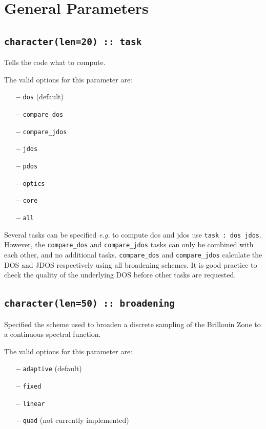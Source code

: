\documentclass[a4paper,11pt,twoside]{book}
\begin{document}
\clearpage


\section{General Parameters}
\subsection[task]{\tt character(len=20) :: task}

Tells the code what to compute. 

The valid options for this parameter are:
\begin{itemize}
\item[{\bf --}]  \verb#dos# (default)
\item[{\bf --}]  \verb#compare_dos#
\item[{\bf --}]  \verb#compare_jdos#
\item[{\bf --}]  \verb#jdos#
\item[{\bf --}]  \verb#pdos#
\item[{\bf --}]  \verb#optics#
\item[{\bf --}]  \verb#core#
\item[{\bf --}]  \verb#all#
\end{itemize}
Several tasks can be specified \emph{e.g.} to compute dos and jdos use
\verb#task : dos jdos#.  
However, the \verb#compare_dos# and \verb#compare_jdos# tasks can only be combined with each other, and no additional tasks.
\verb#compare_dos# and \verb#compare_jdos# calculate the DOS and JDOS respectively using all broadening schemes. It is good practice to check the quality of the underlying DOS before other tasks are requested. 

\subsection[broadening]{\tt character(len=50) :: broadening}

Specified the scheme used to broaden a discrete sampling of the
Brillouin Zone to a continuous spectral function.

The valid options for this parameter are:
\begin{itemize}
\item[{\bf --}]  \verb#adaptive# (default)
\item[{\bf --}]  \verb#fixed#
\item[{\bf --}]  \verb#linear#
\item[{\bf --}]  \verb#quad# (not currently implemented)
\end{itemize}
\end{document}
